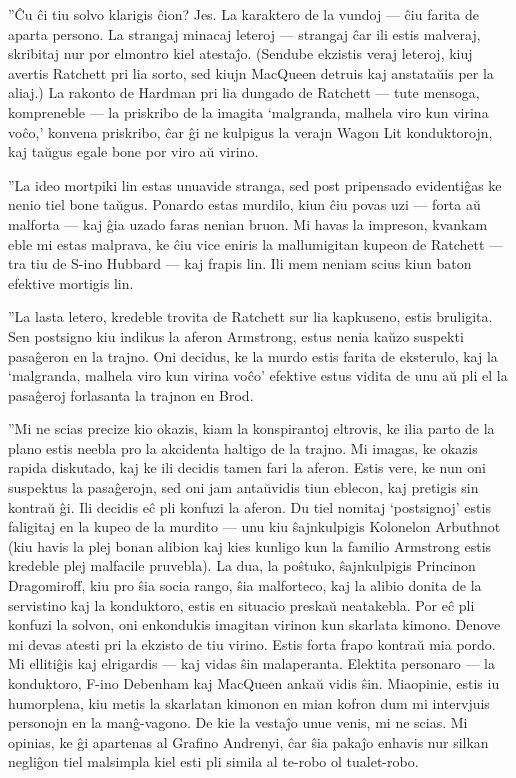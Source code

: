 ''Ĉu ĉi tiu solvo klarigis ĉion? Jes. La karaktero de la vundoj --- ĉiu farita de aparta persono. La strangaj minacaj leteroj --- strangaj ĉar ili estis malveraj, skribitaj nur por elmontro kiel atestaĵo. (Sendube ekzistis veraj leteroj, kiuj avertis Ratchett pri lia sorto, sed kiujn MacQueen detruis kaj anstataŭis per la aliaj.) La rakonto de Hardman pri lia dungado de Ratchett --- tute mensoga, kompreneble --- la priskribo de la imagita `malgranda, malhela viro kun virina voĉo,' konvena priskribo, ĉar ĝi ne kulpigus la verajn Wagon Lit konduktorojn, kaj taŭgus egale bone por viro aŭ virino.

''La ideo mortpiki lin estas unuavide stranga, sed post pripensado evidentiĝas ke nenio tiel bone taŭgus. Ponardo estas murdilo, kiun ĉiu povas uzi --- forta aŭ malforta --- kaj ĝia uzado faras nenian bruon. Mi havas la impreson, kvankam eble mi estas malprava, ke ĉiu vice eniris la mallumigitan kupeon de Ratchett --- tra tiu de S-ino Hubbard --- kaj frapis lin. Ili mem neniam scius kiun baton efektive mortigis lin.

''La lasta letero, kredeble trovita de Ratchett sur lia kapkuseno, estis bruligita. Sen postsigno kiu indikus la aferon Armstrong, estus nenia kaŭzo suspekti pasaĝeron en la trajno. Oni decidus, ke la murdo estis farita de eksterulo, kaj la `malgranda, malhela viro kun virina voĉo' efektive estus vidita de unu aŭ pli el la pasaĝeroj forlasanta la trajnon en Brod.

''Mi ne scias precize kio okazis, kiam la konspirantoj eltrovis, ke ilia parto de la plano estis neebla pro la akcidenta haltigo de la trajno. Mi imagas, ke okazis rapida diskutado, kaj ke ili decidis tamen fari la aferon. Estis vere, ke nun oni suspektus la pasaĝerojn, sed oni jam antaŭvidis tiun eblecon, kaj pretigis sin kontraŭ ĝi. Ili decidis eĉ pli konfuzi la aferon. Du tiel nomitaj `postsignoj' estis faligitaj en la kupeo de la murdito --- unu kiu ŝajnkulpigis Kolonelon Arbuthnot (kiu havis la plej bonan alibion kaj kies kunligo kun la familio Armstrong estis kredeble plej malfacile pruvebla). La dua, la poŝtuko, ŝajnkulpigis Princinon Dragomiroff, kiu pro ŝia socia rango, ŝia malforteco, kaj la alibio donita de la servistino kaj la konduktoro, estis en situacio preskaŭ neatakebla. Por eĉ pli konfuzi la solvon, oni enkondukis imagitan virinon kun skarlata kimono. Denove mi devas atesti pri la ekzisto de tiu virino. Estis forta frapo kontraŭ mia pordo. Mi ellitiĝis kaj elrigardis --- kaj vidas ŝin malaperanta. Elektita personaro --- la konduktoro, F-ino Debenham kaj MacQueen ankaŭ vidis ŝin. Miaopinie, estis iu humorplena, kiu metis la skarlatan kimonon en mian kofron dum mi intervjuis personojn en la manĝ-vagono. De kie la vestaĵo unue venis, mi ne scias. Mi opinias, ke ĝi apartenas al Grafino Andrenyi, ĉar ŝia pakaĵo enhavis nur silkan negliĝon tiel malsimpla kiel esti pli simila al te-robo ol tualet-robo.

